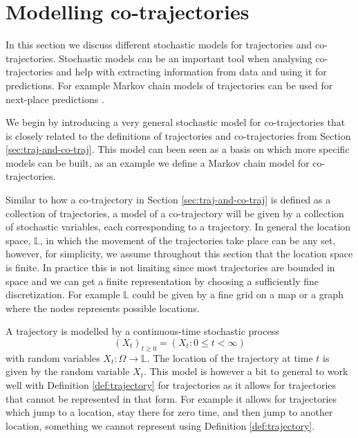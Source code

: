 \documentclass[12pt]{article}
\newcommand{\locset}{\mathbb{L}}
\theoremstyle{definition}
\begin{document}
\section{Modelling co-trajectories}
\label{sec:modell-co-traj}
In this section we discuss different stochastic models for
trajectories and co-trajectories. Stochastic models can be an
important tool when analysing co-trajectories and help with extracting
information from data and using it for predictions. For example Markov
chain models of trajectories can be used for next-place predictions
\cite{gambs_show_2010, gambs_next_2012, yan_semitri:_2011}.

We begin by introducing a very general stochastic model for
co-trajectories that is closely related to the definitions of
trajectories and co-trajectories from Section
\ref{sec:traj-and-co-traj}. This model can been seen as a basis on
which more specific models can be built, as an example we define a
Markov chain model for co-trajectories.

Similar to how a co-trajectory in Section \ref{sec:traj-and-co-traj}
is defined as a collection of trajectories, a model of a co-trajectory
will be given by a collection of stochastic variables, each
corresponding to a trajectory. In general the location space,
\(\locset\), in which the movement of the trajectories take place can
be any set, however, for simplicity, we assume throughout this section
that the location space is finite. In practice this is not limiting
since most trajectories are bounded in space and we can get a finite
representation by choosing a sufficiently fine discretization. For
example \(\locset\) could be given by a fine grid on a map or a graph
where the nodes represents possible locations.

A trajectory is modelled by a continuous-time stochastic process
\begin{equation*}
  (X_{t})_{t \geq 0} = (X_{t}: 0 \leq t < \infty)
\end{equation*}
with random variables \(X_{t}: \Omega \to \locset\). The location of
the trajectory at time \(t\) is given by the random variable
\(X_{t}\). This model is however a bit to general to work well with
Definition \ref{def:trajectory} for trajectories as it allows for
trajectories that cannot be represented in that form. For example it
allows for trajectories which jump to a location, stay there for zero
time, and then jump to another location, something we cannot represent
using Definition \ref{def:trajectory}.
\end{document}
